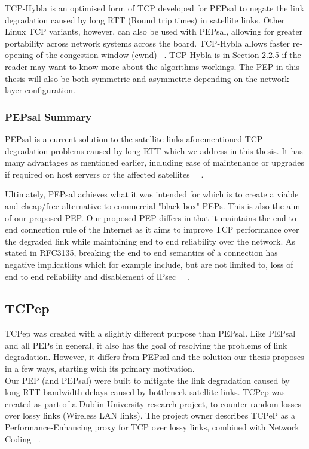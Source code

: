 {TCP-Hybla} is an optimised form of TCP developed for PEPsal to negate the link degradation caused by long RTT (Round trip times) in satellite links.  Other Linux TCP variants, however, can also be used with PEPsal, allowing for greater portability across network systems across the board. TCP-Hybla allows faster re-opening of the congestion window (cwnd) ~\cite{26}. TCP Hybla is in Section 2.2.5 if the reader may want to know more about the algorithms workings. The PEP in this thesis will also be both symmetric and asymmetric depending on the network layer configuration.\\

\subsubsection*{PEPsal Summary}
PEPsal is a current solution to the satellite links aforementioned TCP degradation problems caused by long RTT which we address in this thesis. It has many advantages as mentioned earlier, including ease of maintenance or upgrades if required on host servers or the affected satellites ~\cite{6}~\cite{14}.

Ultimately, PEPsal achieves what it was intended for which is to create a viable and cheap/free alternative to commercial "black-box" PEPs. This is also the aim of our proposed PEP. Our proposed PEP differs in that it maintains the end to end connection rule of the Internet as it aims to improve TCP performance over the degraded link while maintaining end to end reliability over the network. As stated in RFC3135, breaking the end to end semantics of a connection has negative implications which for example include, but are not limited to, loss of end to end reliability and disablement of IPsec ~\cite{6}~\cite{14}. 

\subsection{TCPep}
TCPep was created with a slightly different purpose than PEPsal. Like PEPsal and all PEPs in general, it also has the goal of resolving the problems of link degradation. However, it differs from PEPsal and the solution our thesis proposes in a few ways, starting with its primary motivation. \\

Our PEP (and PEPsal) were built to mitigate the link degradation caused by long RTT bandwidth delays caused by bottleneck satellite links. TCPep was created as part of a Dublin University research project, to counter random losses over lossy links (Wireless LAN links). The project owner describes TCPeP as a Performance-Enhancing proxy for TCP over lossy links, combined with Network Coding ~\cite{33}.\\

